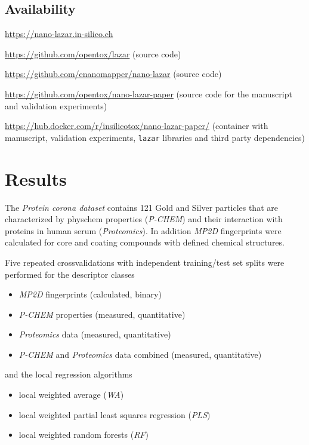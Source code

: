 \documentclass[utf8]{frontiersHLTH} %
\makeatletter
\providecommand{\tightlist}{%
  \setlength{\itemsep}{0pt}\setlength{\parskip}{0pt}}
\newenvironment{description}
	{\list{}{\labelwidth\z@ \itemindent-\leftmargin
		\let\makelabel\descriptionlabel}}
	{\endlist}
\newcommand*\descriptionlabel[1]{\hspace\labelsep
	\normalfont\bfseries #1}
\makeatother
\begin{document}
\subsection{Availability}\label{availability}

\begin{description}
\tightlist
\item[Public webinterface]
\url{https://nano-lazar.in-silico.ch}
\item[\texttt{lazar} framework]
\url{https://github.com/opentox/lazar} (source code)
\item[\texttt{nano-lazar} GUI]
\url{https://github.com/enanomapper/nano-lazar} (source code)
\item[Manuscript]
\url{https://github.com/opentox/nano-lazar-paper} (source code for the
manuscript and validation experiments)
\item[Docker image]
\url{https://hub.docker.com/r/insilicotox/nano-lazar-paper/} (container
with manuscript, validation experiments, \texttt{lazar} libraries and
third party dependencies)
\end{description}

\section{Results}\label{results}

The \emph{Protein corona dataset} contains 121 Gold and Silver particles
that are characterized by physchem properties (\emph{P-CHEM}) and their
interaction with proteins in human serum (\emph{Proteomics}). In
addition \emph{MP2D} fingerprints were calculated for core and coating
compounds with defined chemical structures.

Five repeated crossvalidations with independent training/test set splits
were performed for the descriptor classes

\begin{itemize}
\tightlist
\item
  \emph{MP2D} fingerprints (calculated, binary)
\item
  \emph{P-CHEM} properties (measured, quantitative)
\item
  \emph{Proteomics} data (measured, quantitative)
\item
  \emph{P-CHEM} and \emph{Proteomics} data combined (measured,
  quantitative)
\end{itemize}

and the local regression algorithms

\begin{itemize}
\tightlist
\item
  local weighted average (\emph{WA})
\item
  local weighted partial least squares regression (\emph{PLS})
\item
  local weighted random forests (\emph{RF})
\end{itemize}
\end{document}
